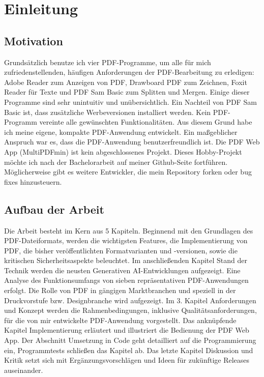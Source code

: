 \chapter{Einleitung}

\section{Motivation}
Grundsätzlich benutze ich vier PDF-Programme, um alle für mich zufriedenstellenden, häufigen Anforderungen der PDF-Bearbeitung zu erledigen: Adobe Reader zum Anzeigen von PDF, Drawboard PDF zum Zeichnen, Foxit Reader für Texte und PDF Sam Basic zum Splitten und Mergen. Einige dieser Programme sind sehr unintuitiv und unübersichtlich. Ein Nachteil von PDF Sam Basic ist, dass zusätzliche Werbeversionen installiert werden. Kein PDF-Programm vereinte alle gewünschten Funktionalitäten. Aus diesem Grund habe ich meine eigene, kompakte PDF-Anwendung entwickelt. Ein maßgeblicher Anspruch war es, dass die PDF-Anwendung benutzerfreundlich ist. Die PDF Web App (MultiPDFmin) ist kein abgeschlossenes Projekt. Dieses Hobby-Projekt möchte ich nach der Bachelorarbeit auf meiner Github-Seite fortführen. Möglicherweise gibt es weitere Entwickler, die mein Repository forken oder bug fixes hinzusteuern.

\section{Aufbau der Arbeit}
Die Arbeit besteht im Kern aus 5 Kapiteln. Beginnend mit den Grundlagen des PDF-Dateiformats, werden die wichtigsten Features, die Implementierung von PDF, die bisher veröffentlichten Formatvarianten und -versionen, sowie die kritischen Sicherheitsaspekte beleuchtet. Im anschließenden Kapitel Stand der Technik werden die neusten Generativen AI-Entwicklungen aufgezeigt. Eine Analyse des Funktionsumfangs von sieben repräsentativen PDF-Anwendungen erfolgt. Die Rolle von PDF in gängigen Marktbranchen und speziell in der Druckvorstufe bzw. Designbranche wird aufgezeigt. Im 3. Kapitel Anforderungen und Konzept werden die Rahmenbedingungen, inklusive Qualitätsanforderungen, für die von mir entwickelte PDF-Anwendung vorgestellt. Das anknüpfende Kapitel Implementierung erläutert und illustriert die Bedienung der PDF Web App. Der Abschnitt Umsetzung in Code geht detailliert auf die Programmierung ein, Programmtests schließen das Kapitel ab. Das letzte Kapitel Diskussion und Kritik setzt sich mit Ergänzungsvorschlägen und Ideen für zukünftige Releases auseinander. 